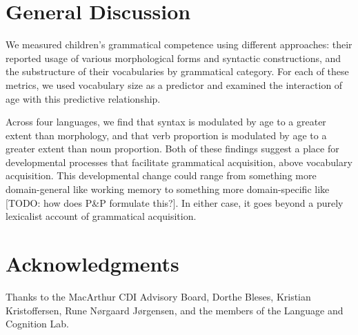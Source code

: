 \documentclass[10pt,letterpaper]{article}
\begin{document}
\section{General Discussion}

We measured children's grammatical competence using different approaches: their reported usage of various morphological forms and syntactic constructions, and the substructure of their vocabularies by grammatical category. For each of these metrics, we used vocabulary size as a predictor and examined the interaction of age with this predictive relationship.

Across four languages, we find that syntax is modulated by age to a greater extent than morphology, and that verb proportion is modulated by age to a greater extent than noun proportion. Both of these findings suggest a place for developmental processes that facilitate grammatical acquisition, above vocabulary acquisition. This developmental change could range from something more domain-general like working memory to something more domain-specific like [TODO: how does P\&P formulate this?]. In either case, it goes beyond a purely lexicalist account of grammatical acquisition.

\section{Acknowledgments}

Thanks to the MacArthur CDI Advisory Board, Dorthe Bleses, Kristian Kristoffersen, Rune N\o rgaard J\o rgensen, and the members of the Language and Cognition Lab. 



\setlength{\bibleftmargin}{.125in}
\setlength{\bibindent}{-\bibleftmargin}



\end{document}
